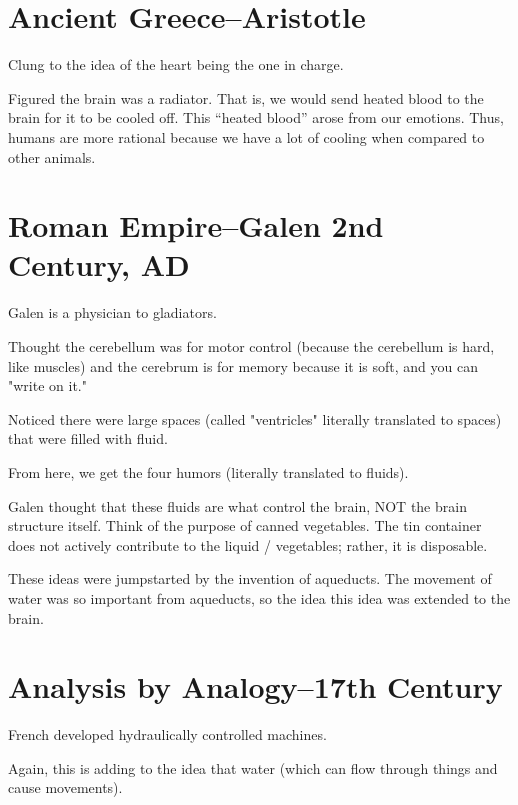\section{Ancient Greece--Aristotle}

\begin{coloredlist}
    \item Clung to the idea of the heart being the one in charge.
    \item Figured the brain was a radiator. That is, we would send heated blood to the brain for it to be cooled off. This ``heated blood'' arose from our emotions. Thus, humans are more rational because we have a lot of cooling when compared to other animals.
\end{coloredlist}

\section{Roman Empire--Galen 2nd Century, AD}

\begin{coloredlist}
    \item Galen is a physician to gladiators.
    \item Thought the cerebellum was for motor control (because the cerebellum is hard, like muscles) and the cerebrum is for memory because it is soft, and you can "write on it."
    \item Noticed there were large spaces (called "ventricles" literally translated to spaces) that were filled with fluid.
    \item From here, we get the four humors (literally translated to fluids).
    \item Galen thought that these fluids are what control the brain, NOT the brain structure itself. Think of the purpose of canned vegetables. The tin container does not actively contribute to the liquid / vegetables; rather, it is disposable.
    \item These ideas were jumpstarted by the invention of aqueducts. The movement of water was so important from aqueducts, so the idea this idea was extended to the brain.
\end{coloredlist}

\section{Analysis by Analogy--17th Century}

\begin{coloredlist}
    \item French developed hydraulically controlled machines.
    \item Again, this is adding to the idea that water (which can flow through things and cause movements).
\end{coloredlist}

